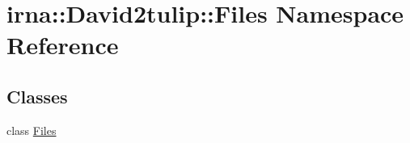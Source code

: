 \hypertarget{namespaceirna_1_1David2tulip_1_1Files}{
\section{irna\-:\-:\-David2tulip\-:\-:\-Files \-Namespace \-Reference}
\label{namespaceirna_1_1David2tulip_1_1Files}
}
\subsection*{\-Classes}
\begin{DoxyCompactItemize}
\item 
class \hyperlink{classirna_1_1David2tulip_1_1Files_1_1Files}{\-Files}
\end{DoxyCompactItemize}
